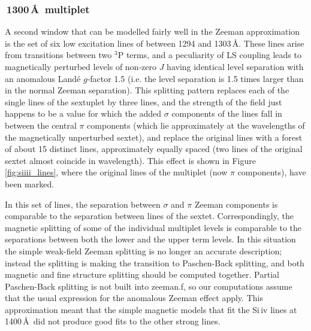 \documentclass[fleqn,usenatbib]{mnras}
\newcommand{\bs}{\ensuremath{\langle \vert B \vert \rangle}}
\begin{document}
\subsubsection{\,1300\,\AA\ multiplet}
A second window that can be modelled fairly well in the Zeeman approximation is the set of six low excitation lines of  between 1294 and 1303\,\AA. These lines arise from transitions between two $^3$P terms, and a peculiarity of LS coupling leads to magnetically perturbed levels of non-zero $J$ having identical level separation with an anomalous Land{\'e} $g$-factor 1.5 (i.e. the level separation is 1.5 times larger than in the normal Zeeman separation). This splitting pattern replaces each of the single lines of the sextuplet by three lines, and the strength of the field just happens to be a value for which the added $\sigma$ components of the lines fall in between the central $\pi$ components (which lie approximately at the wavelengths of the magnetically unperturbed sextet), and replace the original lines with a forest of about 15 distinct lines, approximately equally spaced (two lines of the original sextet almost coincide in wavelength). This effect is shown in Figure\,\ref{fig:siiii_lines}, where the original lines of the multiplet (now $\pi$ components), have been marked.

In this set of lines, the separation between $\sigma$ and $\pi$ Zeeman components is comparable to the separation between lines of the sextet. Correspondingly, the magnetic splitting of some of the individual multiplet levels is comparable to the separations between both the lower and the upper term levels. In this situation the simple weak-field Zeeman splitting is no longer an accurate description; instead the splitting is making the transition to Paschen-Back splitting, and both magnetic and fine structure splitting should be computed together. Partial Paschen-Back splitting is not built into {\sc zeeman.f}, so our computations assume that the usual expression for the anomalous Zeeman effect apply. This approximation meant that the simple magnetic models that fit the Si\,{\sc iv} lines at 1400\,\AA\ did not produce good fits to the other strong lines.

\end{document}
